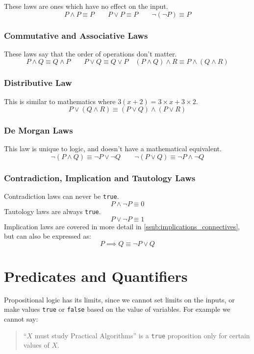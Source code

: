These laws are ones which have no effect on the input.
\[
    P \land P \equiv P \qquad P \lor P \equiv P \qquad \neg(\neg P) \equiv P
\]

\subsubsection{Commutative and Associative Laws}\label{ssub:commutative_and_associative_laws}

These laws say that the order of operations don't matter.
\[
    P \land Q \equiv Q \land P \qquad P \lor Q \equiv Q \lor P \quad (P \land Q) \land R \equiv P \land (Q \land R)
\]

\subsubsection{Distributive Law}\label{ssub:distribuive_lequiv}

This is similar to mathematics where \(3(x+2)=3\times x + 3\times 2\).
\[
    P \lor (Q \land R) \equiv (P \lor Q) \land (P \lor R)
\]

\subsubsection{De Morgan Laws}\label{ssub:de_morgan_laws_lequiv}

This law is unique to logic, and doesn't have a mathematical equivalent.
\[
    \neg(P \land Q) \equiv \neg P \lor \neg Q \qquad \neg (P \lor Q) \equiv \neg P \land \neg Q
\]

\subsubsection{Contradiction, Implication and Tautology Laws}\label{ssub:contradiction_implication_and_tautology_laws}

Contradiction laws can never be \texttt{true}.
\[
    P \land \neg P \equiv 0
\]
Tautology laws are always \texttt{true}.
\[
    P \lor \neg P \equiv 1
\]
Implication laws are covered in more detail in \cref{ssub:implications_connectives}, but can also be expressed as:
\[
    P \implies Q \equiv \neg P \lor Q
\]

\section{Predicates and Quantifiers}\label{sec:predicates_and_quantifiers}

Propositional logic has its limits, since we cannot set limits on the inputs, or make values \texttt{true} or \texttt{false} based on the value of variables.
For example we cannot say:
\begin{quote}
    ``\(X\) must study Practical Algorithms'' is a \texttt{true} proposition only for certain values of \(X\).
\end{quote}

